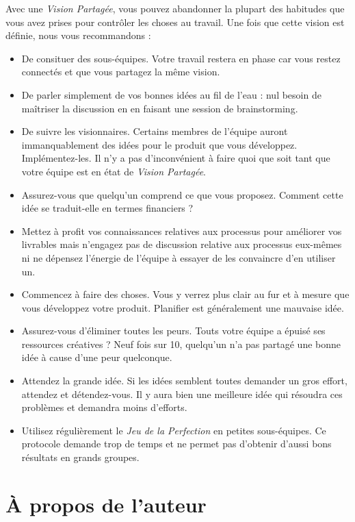 \documentclass[paper=6in:9in,pagesize=pdftex,headinclude=on,footinclude=on,12pt]{scrbook}
\begin{document}
Avec une \emph{Vision Partagée}, vous pouvez abandonner la plupart des habitudes que vous avez prises pour
contrôler les choses au travail. Une fois que cette vision est définie, nous vous recommandons :
\begin{itemize}
	\item De consituer des sous-équipes. Votre travail restera en phase car vous restez connectés et que
	      vous partagez la même vision.
	\item De parler simplement de vos bonnes idées au fil de l'eau : nul besoin de maîtriser la discussion
	      en en faisant une session de \og{}brainstorming\fg{}.
	\item De suivre les visionnaires. Certains membres de l'équipe auront immanquablement des idées pour
	      le produit que vous développez. Implémentez-les. Il n'y a pas d'inconvénient à faire quoi que soit
	      tant que votre équipe est en état de \emph{Vision Partagée}.
	\item Assurez-vous que quelqu'un comprend ce que vous proposez. Comment cette idée se traduit-elle en
	      termes financiers ?
	\item Mettez à profit vos connaissances relatives aux processus pour améliorer vos livrables mais
	      n'engagez pas de discussion relative aux processus eux-mêmes ni ne dépensez l'énergie de l'équipe
	      à essayer de les convaincre d'en utiliser un.
	\item Commencez à faire des choses. Vous y verrez plus clair au fur et à mesure que vous développez
	      votre produit. \og{}Planifier\fg{} est généralement une mauvaise idée.
	\item Assurez-vous d'éliminer toutes les peurs. Touts votre équipe a épuisé ses ressources créatives ?
	      Neuf fois sur 10, quelqu'un n'a pas partagé une bonne idée à cause d'une peur quelconque.
	\item Attendez la grande idée. Si les idées semblent toutes demander un gros effort, attendez et
	      détendez-vous. Il y aura bien une meilleure idée qui résoudra ces problèmes et demandra
	      moins d'efforts.
	\item Utilisez régulièrement le \emph{Jeu de la Perfection} en petites sous-équipes. Ce protocole
	      demande trop de temps et ne permet pas d'obtenir d'aussi bons résultats en grands groupes.
\end{itemize}

\chapter*{À propos de l'auteur}
\end{document}
